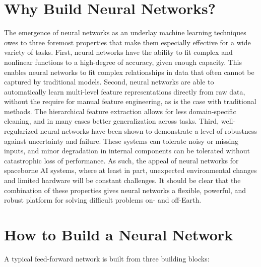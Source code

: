 \section{Why Build Neural Networks?}
The emergence of neural networks as an underlay machine learning techniques owes to three foremost properties that make them especially effective for a wide variety of tasks. First, neural networks have the ability to fit complex and nonlinear functions to a high-degree of accuracy, given enough capacity. This enables neural networks to fit complex relationships in data that often cannot be captured by traditional models. Second, neural networks are able to automatically learn multi-level feature representations directly from raw data, without the require for manual feature engineering, as is the case with traditional methods. The hierarchical feature extraction allows for less domain-specific cleaning, and in many cases better generalization across tasks. Third, well-regularized neural networks have been shown to demonstrate a level of robustness against uncertainty and failure. These systems can tolerate noisy or missing inputs, and minor degradation in internal components can be tolerated without catastrophic loss of performance. As such, the appeal of neural networks for spaceborne AI systems, where at least in part, unexpected environmental changes and limited hardware will be constant challenges. It should be clear that the combination of these properties gives neural networks a flexible, powerful, and robust platform for solving difficult problems on- and off-Earth.















\section{How to Build a Neural Network}
A typical feed-forward network is built from three building blocks:


